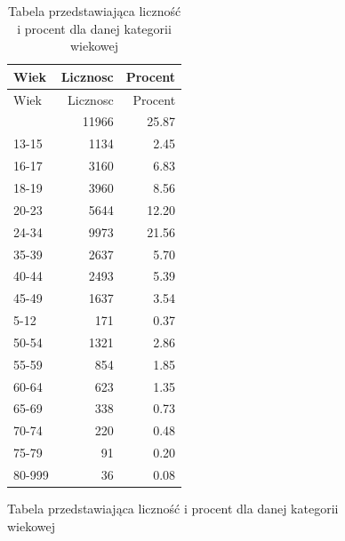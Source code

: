 \documentclass[
  letterpaper,
  DIV=11,
  numbers=noendperiod]{scrartcl}
\begin{document}
\begin{figure}

\begin{minipage}[t]{0.50\linewidth}

{\centering 


\caption{Histogram zmiennej - Kategoria wiekowa}

}

\end{minipage}%
%
\begin{minipage}[t]{0.50\linewidth}

{\centering 

\begin{longtable}[]{@{}lrr@{}}
\caption{Tabela przedstawiająca liczność i procent dla danej kategorii
wiekowej }\tabularnewline
\toprule\noalign{}
Wiek & Licznosc & Procent \\
\midrule\noalign{}
\endfirsthead
\toprule\noalign{}
Wiek & Licznosc & Procent \\
\midrule\noalign{}
\endhead
\bottomrule\noalign{}
\endlastfoot
& 11966 & 25.87 \\
13-15 & 1134 & 2.45 \\
16-17 & 3160 & 6.83 \\
18-19 & 3960 & 8.56 \\
20-23 & 5644 & 12.20 \\
24-34 & 9973 & 21.56 \\
35-39 & 2637 & 5.70 \\
40-44 & 2493 & 5.39 \\
45-49 & 1637 & 3.54 \\
5-12 & 171 & 0.37 \\
50-54 & 1321 & 2.86 \\
55-59 & 854 & 1.85 \\
60-64 & 623 & 1.35 \\
65-69 & 338 & 0.73 \\
70-74 & 220 & 0.48 \\
75-79 & 91 & 0.20 \\
80-999 & 36 & 0.08 \\
\end{longtable}

}
\end{minipage}
\end{figure}
\end{document}
